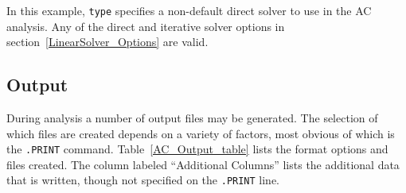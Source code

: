 In this example, \texttt{type} specifies a non-default direct solver
to use in the AC analysis.  Any of the direct and iterative solver options in
section~\ref{LinearSolver_Options} are valid. 

\subsection{Output}
\label{AC_Output}

During analysis a number of output files may be generated.  The
selection of which files are created depends on a variety of factors,
most obvious of which is the \texttt{.PRINT} command.
Table~\ref{AC_Output_table} lists the format options and files created.
The column labeled ``Additional Columns'' lists the additional data that
is written, though not specified on the \texttt{.PRINT} line.

